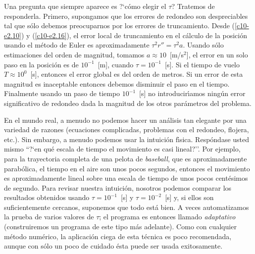 Una pregunta que siempre aparece es ?`c{\'o}mo elegir el $\tau$? Tratemos de
responderla. Primero, supongamos que los errores de redondeo son
despreciables tal que s{\'o}lo debemos preocuparnos por los errores de
truncamiento. Desde (\ref{c10-e2.10}) y (\ref{c10-e2.16}), el error
local de truncamiento en el c{\'a}lculo de la posici{\'o}n usando el m{\'e}todo de
Euler es aproximadamente $\tau^2 r''=\tau^2a$. Usando s{\'o}lo estimaciones del
orden de magnitud, tomamos $a\approx10$~[m/s$^2$], el error en un solo paso
en la posici{\'o}n es de $10^{-1}$~[m], cuando $\tau=10^{-1}$~[s]. Si el
tiempo de vuelo $T\approx 10^0$~[s], entonces el error global es del orden
de metros. Si un error de esta magnitud es inaceptable entonces
debemos disminuir el paso en el tiempo. Finalmente usando un paso de
tiempo $10^{-1}$~[s] no introducir{\'\i}amos ning{\'u}n error significativo de
redondeo dada la magnitud de los otros par{\'a}metros del problema.

En el mundo real, a menudo no podemos hacer un an{\'a}lisis tan elegante
por una variedad de razones (ecuaciones complicadas, problemas con el
redondeo, flojera, etc.). Sin embargo, a menudo podemos usar la
intuici{\'o}n f{\'\i}sica. Resp{\'o}ndase usted mismo ``?`en qu{\'e} escala de tiempo
el movimiento es casi lineal?''. Por ejemplo, para la trayectoria
completa de una pelota de {\em baseball}, que es aproximadamente
parab{\'o}lica, el tiempo en el aire son unos pocos segundos, entonces el
movimiento es aproximadamente lineal sobre una escala de tiempo de
unos pocos cent{\'e}simos de segundo. Para revisar nuestra intuici{\'o}n,
nosotros podemos comparar los resultados obtenidos usando
$\tau=10^{-1}$~[s] y $\tau=10^{-2}$~[s] y, si ellos son suficientemente
cercanos, suponemos que todo est{\'a} bien. A veces automatizamos la
prueba de varios valores de $\tau$; el programa es entonces llamado {\em
  adaptativo} (construiremos un programa de este tipo m{\'a}s adelante).
Como con cualquier m{\'e}todo num{\'e}rico, la aplicaci{\'o}n ciega de esta
t{\'e}cnica es poco recomendada, aunque con s{\'o}lo un poco de cuidado {\'e}sta
puede ser usada exitosamente.

